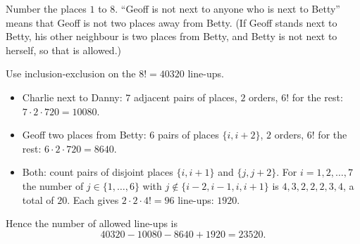 Number the places $1$ to $8$. ``Geoff is not next to anyone who is next to Betty'' means that Geoff is not two places away from Betty. (If Geoff stands next to Betty, his other neighbour is two places from Betty, and Betty is not next to herself, so that is allowed.)

Use inclusion-exclusion on the $8!=40320$ line-ups.
\begin{itemize}
\item Charlie next to Danny: $7$ adjacent pairs of places, $2$ orders, $6!$ for the rest: $7\cdot2\cdot720=10080$.
\item Geoff two places from Betty: $6$ pairs of places $\{i,i+2\}$, $2$ orders, $6!$ for the rest: $6\cdot2\cdot720=8640$.
\item Both: count pairs of disjoint places $\{i,i+1\}$ and $\{j,j+2\}$. For $i=1,2,\dots,7$ the number of $j\in\{1,\dots,6\}$ with $j\notin\{i-2,i-1,i,i+1\}$ is $4,3,2,2,2,3,4$, a total of $20$. Each gives $2\cdot2\cdot4!=96$ line-ups: $1920$.
\end{itemize}
Hence the number of allowed line-ups is
\[40320-10080-8640+1920=\boxed{23520}.\]
